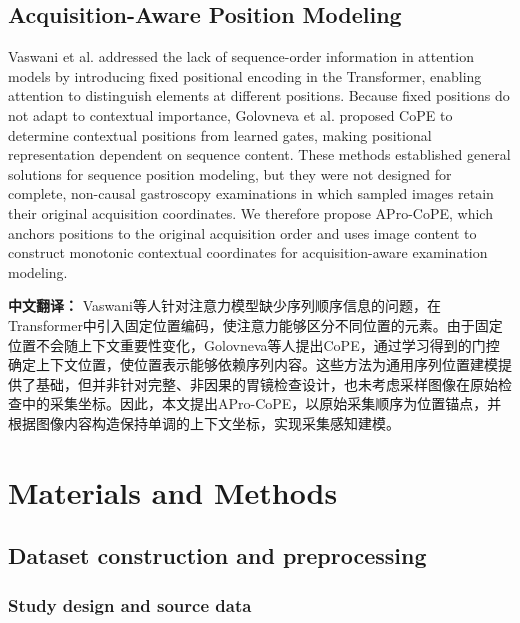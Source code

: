 \documentclass[Afour,sagev,times]{sagej}
\begin{document}
\subsection{Acquisition-Aware Position Modeling}

Vaswani et al. addressed the lack of sequence-order information in attention models by introducing fixed positional encoding in the Transformer, enabling attention to distinguish elements at different positions.\cite{R26} Because fixed positions do not adapt to contextual importance, Golovneva et al. proposed CoPE to determine contextual positions from learned gates, making positional representation dependent on sequence content.\cite{R27} These methods established general solutions for sequence position modeling, but they were not designed for complete, non-causal gastroscopy examinations in which sampled images retain their original acquisition coordinates. We therefore propose APro-CoPE, which anchors positions to the original acquisition order and uses image content to construct monotonic contextual coordinates for acquisition-aware examination modeling.

\noindent\textbf{中文翻译：}
Vaswani等人针对注意力模型缺少序列顺序信息的问题，在Transformer中引入固定位置编码，使注意力能够区分不同位置的元素。由于固定位置不会随上下文重要性变化，Golovneva等人提出CoPE，通过学习得到的门控确定上下文位置，使位置表示能够依赖序列内容。这些方法为通用序列位置建模提供了基础，但并非针对完整、非因果的胃镜检查设计，也未考虑采样图像在原始检查中的采集坐标。因此，本文提出APro-CoPE，以原始采集顺序为位置锚点，并根据图像内容构造保持单调的上下文坐标，实现采集感知建模。
\section{Materials and Methods}

\subsection{Dataset construction and preprocessing}

\subsubsection{Study design and source data}
\end{document}
